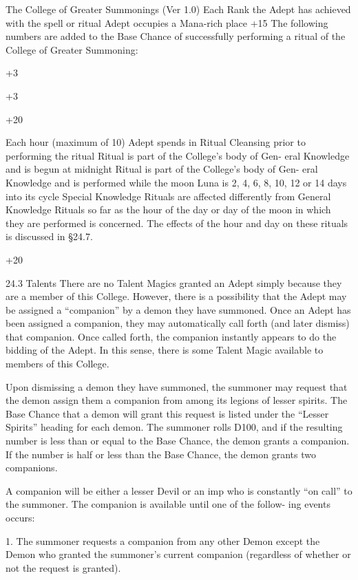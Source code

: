 \begin{Chapter}{The College of Greater Summonings (Ver 1.0)}
Each Rank the Adept has achieved with the 
spell or ritual 
Adept occupies a Mana-rich place 
+15 
The  following  numbers  are  added  to  the  Base 
Chance  of  successfully  performing  a  ritual  of  the 
College of Greater Summoning: 

+3 

+3 

+20 

Each hour (maximum of 10) Adept spends in 
Ritual Cleansing prior to performing the 
ritual 
Ritual is part of the College’s body of Gen-
eral Knowledge and is begun at midnight 
Ritual is part of the College’s body of Gen-
eral Knowledge and is performed while the 
moon Luna is 2, 4, 6, 8, 10, 12 or 14 days 
into its cycle 
Special Knowledge Rituals are affected differently 
from General Knowledge Rituals so far as the hour 
of  the  day  or  day  of  the  moon  in  which  they  are 
performed  is  concerned.  The  effects  of  the  hour 
and day on these rituals is discussed in §24.7. 

+20 

24.3 Talents 
There  are  no  Talent  Magics  granted  an  Adept 
simply because they are a member of this College. 
However, there is a possibility that the Adept may 
be  assigned  a  “companion”  by  a  demon  they  have 
summoned.  Once  an  Adept  has  been  assigned  a 
companion, they may automatically call forth (and 
later  dismiss)  that  companion.  Once  called  forth, 
the  companion  instantly  appears  to  do  the  bidding 
of  the  Adept.  In  this  sense,  there  is  some  Talent 
Magic available to members of this College. 

Upon  dismissing  a  demon  they  have  summoned, 
the  summoner  may  request  that  the  demon  assign 
them a companion from among its legions of lesser 
spirits.  The  Base  Chance  that  a  demon  will  grant 
this  request  is  listed  under  the  “Lesser  Spirits” 
heading  for  each  demon.  The  summoner  rolls 
D100,  and  if  the  resulting  number  is  less  than  or 
equal  to  the  Base  Chance,  the  demon  grants  a 
companion.  If  the  number  is  half  or  less  than  the 
Base Chance, the demon grants two companions. 

A  companion  will  be  either  a  lesser  Devil  or  an 
imp  who  is  constantly  “on  call”  to  the  summoner. 
The companion is available until one of the follow-
ing events occurs: 

1.  The  summoner  requests  a  companion  from  any 
other  Demon  except  the  Demon  who  granted  the 
summoner’s  current  companion  (regardless  of 
whether or not the request is granted). 


\end{Chapter}
